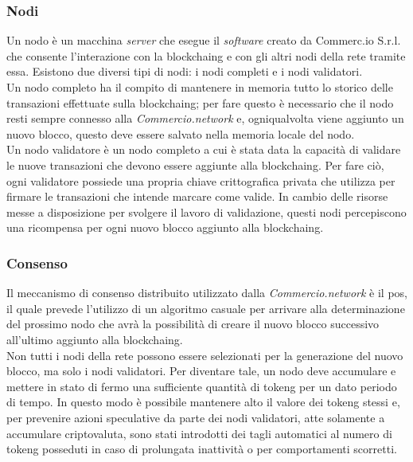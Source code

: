 \subsubsection*{Nodi}

Un nodo è un macchina \textit{server} che esegue il \textit{software} creato da Commerc.io S.r.l. che consente l'interazione con la \gls{blockchaing} e con gli altri nodi della rete tramite essa. Esistono due diversi tipi di nodi: i nodi completi e i nodi validatori.\\
Un nodo completo ha il compito di mantenere in memoria tutto lo storico delle transazioni effettuate sulla \gls{blockchaing}; per fare questo è necessario che il nodo resti sempre connesso alla \textit{Commercio.network} e, ogniqualvolta viene aggiunto un nuovo blocco, questo deve essere salvato nella memoria locale del nodo.\\
Un nodo validatore è un nodo completo a cui è stata data la capacità di validare le nuove transazioni che devono essere aggiunte alla \gls{blockchaing}. Per fare ciò, ogni validatore possiede una propria chiave crittografica privata che utilizza per firmare le transazioni che intende marcare come valide. In cambio delle risorse messe a disposizione per svolgere il lavoro di validazione, questi nodi percepiscono una ricompensa per ogni nuovo blocco aggiunto alla \gls{blockchaing}.

\subsubsection*{Consenso}

Il meccanismo di consenso distribuito utilizzato dalla \textit{Commercio.network} è il \gls{pos}, il quale prevede l'utilizzo di un algoritmo casuale per arrivare alla determinazione del prossimo nodo che avrà la possibilità di creare il nuovo blocco successivo all'ultimo aggiunto alla \gls{blockchaing}.\\
Non tutti i nodi della rete possono essere selezionati per la generazione del nuovo blocco, ma solo i nodi validatori. Per diventare tale, un nodo deve accumulare e mettere in stato di fermo una sufficiente quantità di \gls{tokeng} per un dato periodo di tempo. In questo modo è possibile mantenere alto il valore dei \gls{tokeng} stessi e, per prevenire azioni speculative da parte dei nodi validatori, atte solamente a accumulare criptovaluta, sono stati introdotti dei tagli automatici al numero di \gls{tokeng} posseduti in caso di prolungata inattività o per comportamenti scorretti.

